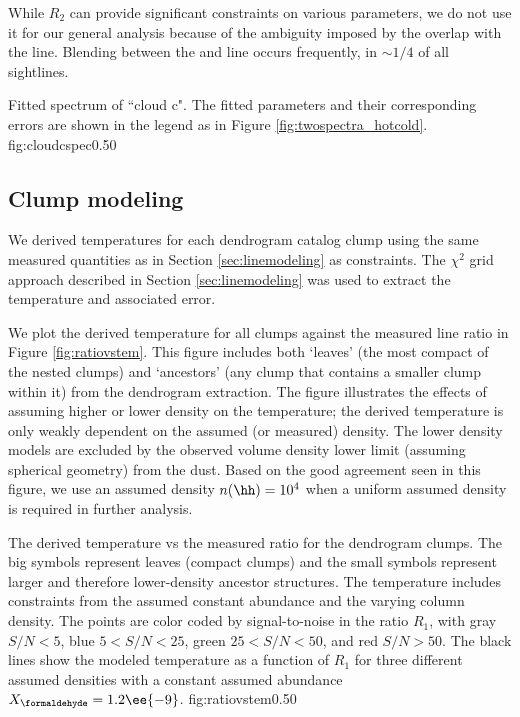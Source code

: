 While $R_2$ can provide significant constraints on various parameters, we do
not use it for our general analysis because of the ambiguity imposed by the
overlap with the \methanol \fourtwotwo line.  Blending between the \methanol
\fourtwotwo and \formaldehyde \threetwotwo line occurs frequently, in $\sim1/4$
of all sightlines.



{Fitted spectrum of ``cloud c".  The fitted parameters and their corresponding
errors are shown in the legend as in Figure \ref{fig:twospectra_hotcold}.}
{fig:cloudcspec}{0.5}{0}



\subsection{Clump modeling}
\label{sec:dendromod}
We derived temperatures for each dendrogram catalog clump using the same
measured quantities as in Section \ref{sec:linemodeling} as constraints.  The
$\chi^2$ grid approach described in Section \ref{sec:linemodeling} was used to
extract the temperature and associated error.

We plot the derived temperature for all clumps against the measured line ratio
in Figure \ref{fig:ratiovstem}.  This figure includes both `leaves' (the most
compact of the nested clumps) and `ancestors' (any clump that contains a
smaller clump within it)
from the dendrogram extraction.  The figure illustrates the effects of assuming
higher or lower density on the temperature; the derived temperature is only weakly dependent
on the assumed (or measured) density. The lower density models are excluded by
the observed volume density lower limit (assuming spherical geometry) from the
dust.  Based on the good agreement seen in this figure, we use an assumed
density $n(\hh)=10^4$ \percc when a uniform assumed density is required in
further analysis.

{The derived temperature vs the measured ratio \Rone for the dendrogram clumps.
The big symbols represent leaves (compact clumps) and the small symbols
represent larger and therefore lower-density ancestor structures.
The temperature includes constraints from the assumed constant \formaldehyde
abundance and the 
varying column density.  The points are color coded by signal-to-noise in the
ratio $R_1$, with gray $S/N < 5$, blue $5 < S/N < 25$, green $25 < S/N < 50$,
and red $S/N > 50$.  The black lines show the modeled temperature as a function of
$R_1$ for three different assumed densities with a constant assumed abundance
$X_{\formaldehyde} = 1.2\ee{-9}$.
}
{fig:ratiovstem}{0.5}{0}

